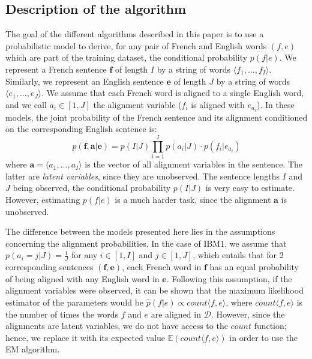 \documentclass[10pt]{article}
\begin{document}
\subsection{Description of the algorithm}
The goal of the different algorithms described in this paper is to use a probabilistic model to derive, for any pair of French and English words $(f,e)$ which are part of the training dataset, the conditional probability $p(f \vert e)$. We represent a French sentence $\mathbf{f}$ of length $I$ by a string of words $\langle f_1, \ldots, f_I \rangle$. Similarly, we represent an English sentence $\mathbf{e}$ of length $J$ by a string of words $\langle e_1, \ldots, e_J \rangle$. We assume that each French word is aligned to a single English word, and we call $a_i \in [1, J]$ the alignment variable ($f_i$ is aligned with $e_{a_i}$). In these models, the joint probability of the French sentence and its alignment conditioned on the corresponding English sentence is:
\begin{equation}
p(\mathbf{f}, \mathbf{a} \vert \mathbf{e}) = p(I \vert J) \prod_{i=1}^I p(a_i \vert J) \cdot p(f_i \vert e_{a_i})
\end{equation}
where $\mathbf{a} = \langle a_1, \ldots, a_I \rangle$ is the vector of all alignment variables in the sentence. The latter are \textit{latent variables}, since they are unobserved. The sentence lengths $I$ and $J$ being observed, the conditional probability $p(I \vert J)$ is very easy to estimate. However, estimating $p(f \vert e)$ is a much harder task, since the alignment $\mathbf{a}$ is unobserved.

The difference between the models presented here lies in the assumptions concerning the alignment probabilities. In the case of IBM1, we assume that $p(a_i = j \vert J) = \frac{1}{J}$ for any $i \in [1,I]$ and $j \in [1,J]$, which entails that for 2 corresponding sentences $(\mathbf{f}, \mathbf{e})$, each French word in $\mathbf{f}$ has an equal probability of being aligned with any English word in $\mathbf{e}$. Following this assumption, if the alignment variables were observed, it can be shown that the maximum likelihood estimator of the parameters would be  $\hat{p}(f \vert e) \propto count \langle f, e \rangle$, where $count \langle f, e \rangle$ is the number of times the words $f$ and $e$ are aligned in $\mathcal{D}$. However, since the alignments are latent variables, we do not have access to the $count$ function; hence, we replace it with its expected value $\mathbb{E}(count \langle f, e \rangle)$ in order to use the EM algorithm.
\end{document}

